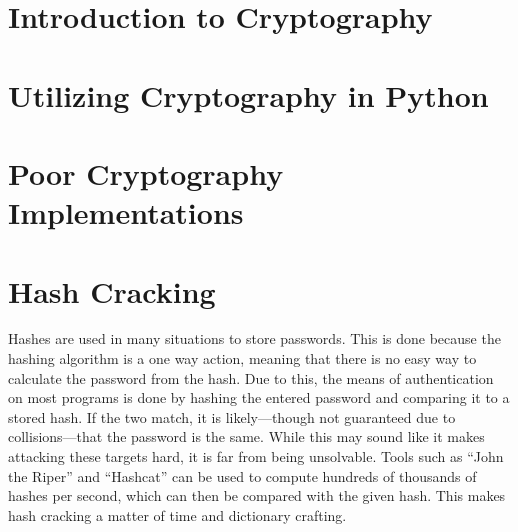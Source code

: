 \documentclass[a4paper,11pt]{report}
\begin{document}
	\section{Introduction to Cryptography}
	\section{Utilizing Cryptography in Python}
	\section{Poor Cryptography Implementations}
	\section{Hash Cracking}
		Hashes are used in many situations to store passwords. 
		This is done because the hashing algorithm is a one way action, meaning that there is no easy way to calculate the password from the hash. 
		Due to this, the means of authentication on most programs is done by hashing the entered password and comparing it to a stored hash. 
		If the two match, it is likely---though not guaranteed due to collisions---that the password is the same. 
		While this may sound like it makes attacking these targets hard, it is far from being unsolvable. 
		Tools such as ``John the Riper'' and ``Hashcat'' can be used to compute hundreds of thousands of hashes per second, which can then be compared with the given hash. 
		This makes hash cracking a matter of time and dictionary crafting. 
\end{document}
